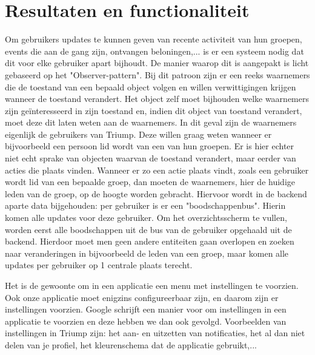 
\chapter{Resultaten en functionaliteit}



Om gebruikers updates te kunnen geven van recente activiteit van hun groepen, events die aan de gang zijn, ontvangen beloningen,... is er een systeem nodig dat dit voor elke gebruiker apart bijhoudt.
De manier waarop dit is aangepakt is licht gebaseerd op het "Observer-pattern". Bij dit patroon zijn er een reeks waarnemers die de toestand van een bepaald object volgen 
en willen verwittigingen krijgen wanneer de toestand verandert. 
Het object zelf moet bijhouden welke waarnemers zijn geïnteresseerd in zijn toestand en, indien dit object van toestand verandert, moet deze dit laten weten aan de waarnemers.
In dit geval zijn de waarnemers eigenlijk de gebruikers van Triump. Deze willen graag weten wanneer er bijvoorbeeld een persoon lid wordt van een van hun groepen.
Er is hier echter niet echt sprake van objecten waarvan de toestand verandert, maar eerder van acties die plaats vinden. Wanneer er zo een actie plaats vindt, zoals een gebruiker wordt lid van een bepaalde groep,
dan moeten de waarnemers, hier de huidige leden van de groep, op de hoogte worden gebracht.
Hiervoor wordt in de backend aparte data bijgehouden: per gebruiker is er een "boodschappenbus". Hierin komen alle updates voor deze gebruiker. Om het overzichtsscherm te vullen, worden eerst alle boodschappen uit de bus van de gebruiker opgehaald uit de backend. Hierdoor moet men geen andere entiteiten gaan overlopen en zoeken naar veranderingen in bijvoorbeeld de leden van een groep, maar komen alle updates per gebruiker op 1 centrale plaats terecht.

Het is de gewoonte om in een applicatie een menu met instellingen te voorzien. Ook onze applicatie moet enigzins configureerbaar zijn, en daarom zijn er instellingen voorzien.
Google schrijft een manier voor om instellingen in een applicatie te voorzien %
en deze hebben we dan ook gevolgd. Voorbeelden van instellingen in Triump zijn: het aan- en uitzetten van notificaties, het al dan niet delen van je profiel, het kleurenschema dat de applicatie gebruikt,...

